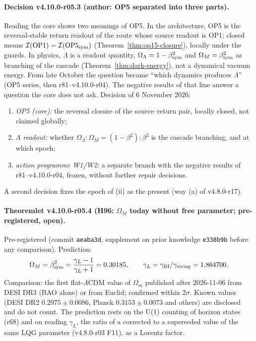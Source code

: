 \paragraph{Decision v4.10.0-r05.3 (author: OP5 separated into three parts).}
Reading the core shows two meanings of OP5.  In the architecture, OP5 is the reversal-stable return readout of the route whose source readout is
OP1; closed means \(\mathcal I(\mathrm{OP1})=\mathcal I(\mathrm{OP5}_{\rm sym})\) (Theorem~\ref{thm:op15-closure}), locally under the guards.  In physics,
\(\Lambda\) is a readout quantity, \(\Omega_\Lambda=1-\beta_{\rm sym}^2\) and \(\Omega_M=\beta_{\rm sym}^2\) as branching of the cascade
(Theorem~\ref{thm:dark-energy}), not a dynamical vacuum energy.  From late October the question became ``which dynamics produces \(\Lambda\)'' (OP5
series, then r81--v4.10.0-r04).  The negative results of that line answer a question the core does not ask.  Decision of 6 November 2026:
\begin{enumerate}[leftmargin=2em]
\item[(i)] \emph{OP5 (core):} the reversal closure of the source--return pair, locally closed, not claimed globally;
\item[(ii)] \emph{\(\Lambda\) readout:} whether \(\Omega_\Lambda:\Omega_M=(1-\beta^2):\beta^2\) is the cascade branching, and at which epoch;
\item[(iii)] \emph{action programme W1/W2:} a separate branch with the negative results of r81--v4.10.0-r04, frozen, without further repair decisions.
\end{enumerate}
A second decision fixes the epoch of (ii) as the present (way (a) of v4.8.0-r17).

\paragraph{Theoremlet v4.10.0-r05.4 (H96: \(\Omega_M\) today without free parameter; pre-registered, open).}
Pre-registered (commit \texttt{aeaba3d}, supplement on prior knowledge \texttt{e338b9b} before any comparison).  Prediction:
\[
\Omega_M=\beta_{\rm sym}^2=\frac{\gamma_L-1}{\gamma_L+1}=0.30185,\qquad \gamma_L=\gamma_{\rm BI}/\gamma_{\rm string}=1.864700.
\]
Comparison: the first flat-\(\Lambda\)CDM value of \(\Omega_m\) published after 2026-11-06 from DESI DR3 (BAO alone) or from Euclid; confirmed within
\(2\sigma\).  Known values (DESI DR2 \(0.2975\pm0.0086\), Planck \(0.3153\pm0.0073\) and others) are disclosed and do not count.  The prediction rests on the
U(1) counting of horizon states (r68) and on reading \(\gamma_L\), the ratio of a corrected to a superseded value of the same LQG parameter
(v4.8.0-r03 F11), as a Lorentz factor.

